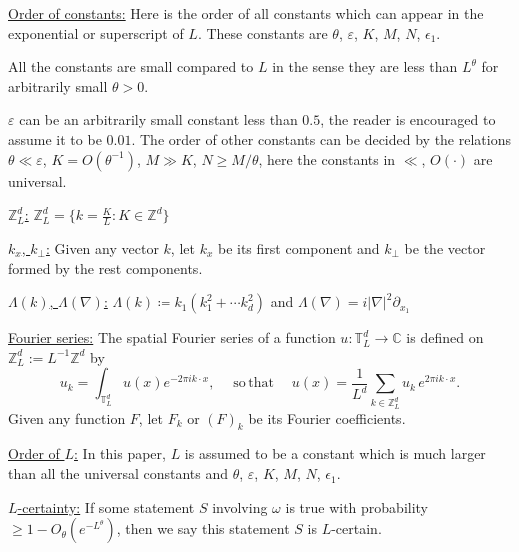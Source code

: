 \underline{Order of constants:} Here is the order of all constants which can appear in the exponential or superscript of $L$. These constants are $\theta$, $\varepsilon$, $K$, $M$, $N$, $\epsilon_1$.%

All the constants are small compared to $L$ in the sense they are less than $L^{\theta}$ for arbitrarily small $\theta>0$.

$\varepsilon$ can be an arbitrarily small constant less than $0.5$, the reader is encouraged to assume it to be $0.01$. The order of other constants can be decided by the relations $\theta\ll \varepsilon$, $K=O(\theta^{-1})$, $M\gg K$, $N\ge M/\theta$, here the constants in $\ll$, $O(\cdot)$ are universal. 

\underline{$\mathbb{Z}_L^d$:} $\mathbb{Z}_L^d= \{k=\frac{K}{L}:K\in \mathbb{Z}^d\}$

\underline{$k_x$, $k_{\perp}$:} Given any vector $k$, let $k_x$ be its first component and $k_{\perp}$ be the vector formed by the rest components. 

\underline{$\Lambda(k)$, $\Lambda(\nabla)$:} $\Lambda(k)\coloneqq k_{1}(k_1^2+\cdots k_d^2)$ and $\Lambda(\nabla) = i|\nabla|^2\partial_{x_1}$

\underline{Fourier series:} The spatial Fourier series of a function $u: \mathbb{T}_L^d \to \mathbb C$ is defined on $\mathbb{Z}^d_L:=L^{-1}\mathbb{Z}^{d}$ by
\begin{equation}\label{fourierset}
u_k=\int_{\mathbb{T}^d_L} u(x) e^{-2\pi i k\cdot x},\quad \mathrm{\; so \,that \;}\quad u(x)=\frac{1}{L^d}\sum_{k \in \mathbb{Z}^d_L} u_k \,e^{2\pi i k\cdot x}. 
\end{equation}
Given any function $F$, let $F_k$ or $(F)_k$ be its Fourier coefficients.

\underline{Order of $L$:} In this paper, $L$ is assumed to be a constant which is much larger than all the universal constants and $\theta$, $\varepsilon$, $K$, $M$, $N$, $\epsilon_1$. 

\underline{$L$-certainty:} If some statement $S$ involving $\omega$ is true with probability $\geq 1-O_{\theta}(e^{-L^\theta})$, then we say this statement $S$ is $L$-certain.










